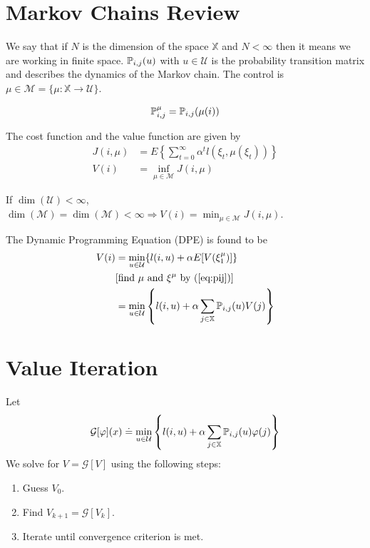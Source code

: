 % 
% 
%
%
% 
\mainmatter
\setcounter{page}{1}

\lectureseries[\course]{\course}

\date{November 3, 2009}

\setaddress

\setcounter{lecture}{10}
\setcounter{chapter}{10}


\section{Markov Chains Review}
We say that if $N$ is the dimension of the space $\mathbb{X}$ and $N<\infty$ then it means we are working in finite space. $\mathbb{P}_{i,j}(u)$ with $u\in\mathcal{U}$ is the probability transition matrix and describes the dynamics of the Markov chain. The control is $\mu\in\mathcal{M} = \{\mu:\mathbb{X}\to\mathcal{U}\}$.

\begin{align}
\label{eq:pij}
\mathbb{P}_{i,j}^\mu = \mathbb{P}_{i,j}(\mu(i))
\end{align}

The cost function and the value function are given by
\begin{align*}
J(i,\mu) &= E\left\lbrace \sum_{t=0}^\infty \alpha^tl(\xi_t,\mu(\xi_t))\right\rbrace \\
V(i) &= \inf_{\mu\in\mathcal{M}}J(i,\mu)
\end{align*}

If $\dim(\mathcal{U})<\infty$, $\dim(\mathcal{M})=\dim(\mathcal{M})<\infty\Rightarrow V(i)=\min_{\mu\in\mathcal{M}}J(i,\mu)$.

The Dynamic Programming Equation (DPE) is found to be
\begin{align}
\label{eq:mcdpe}
V(i) &= \min_{u\in\mathcal{U}}\{l(i,u)+\alpha E[V(\xi_1^\mu)]\} \nonumber \\
&[\text{find } \mu \text{ and } \xi^\mu \text{ by (\ref{eq:pij})}] \nonumber \\
&= \min_{u\in\mathcal{U}} \left\lbrace l(i,u)+\alpha\sum_{j\in\mathbb{X}}\mathbb{P}_{i,j}(u)V(j)\right\rbrace
\end{align}

\section{Value Iteration}
Let
$$\mathcal{G}[\varphi](x) \doteq \min_{u\in\mathcal{U}}\left\lbrace l(i,u)+\alpha\sum_{j\in\mathbb{X}}\mathbb{P}_{i,j}(u)\varphi(j)\right\rbrace$$
We solve for $V=\mathcal{G}[V]$ using the following steps:
\begin{enumerate}
\item Guess $V_0$.
\item Find $V_{k+1}=\mathcal{G}[V_k]$.
\item Iterate until convergence criterion is met.
\end{enumerate}

